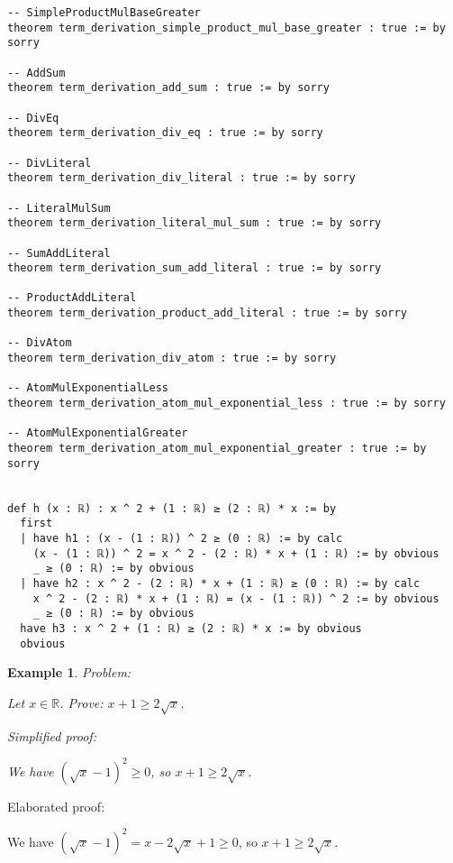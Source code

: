 \documentclass{article}
\newtheorem{example}{Example}
\begin{document}
\begin{tcolorbox}[colback=white!10, width=\linewidth]
\begin{lstlisting}[language=Lean4]
-- SimpleProductMulBaseGreater
theorem term_derivation_simple_product_mul_base_greater : true := by sorry

-- AddSum
theorem term_derivation_add_sum : true := by sorry

-- DivEq
theorem term_derivation_div_eq : true := by sorry

-- DivLiteral
theorem term_derivation_div_literal : true := by sorry

-- LiteralMulSum
theorem term_derivation_literal_mul_sum : true := by sorry

-- SumAddLiteral
theorem term_derivation_sum_add_literal : true := by sorry

-- ProductAddLiteral
theorem term_derivation_product_add_literal : true := by sorry

-- DivAtom
theorem term_derivation_div_atom : true := by sorry

-- AtomMulExponentialLess
theorem term_derivation_atom_mul_exponential_less : true := by sorry

-- AtomMulExponentialGreater
theorem term_derivation_atom_mul_exponential_greater : true := by sorry


def h (x : ℝ) : x ^ 2 + (1 : ℝ) ≥ (2 : ℝ) * x := by
  first
  | have h1 : (x - (1 : ℝ)) ^ 2 ≥ (0 : ℝ) := by calc
    (x - (1 : ℝ)) ^ 2 = x ^ 2 - (2 : ℝ) * x + (1 : ℝ) := by obvious
    _ ≥ (0 : ℝ) := by obvious
  | have h2 : x ^ 2 - (2 : ℝ) * x + (1 : ℝ) ≥ (0 : ℝ) := by calc
    x ^ 2 - (2 : ℝ) * x + (1 : ℝ) = (x - (1 : ℝ)) ^ 2 := by obvious
    _ ≥ (0 : ℝ) := by obvious
  have h3 : x ^ 2 + (1 : ℝ) ≥ (2 : ℝ) * x := by obvious
  obvious

\end{lstlisting}
\end{tcolorbox}


\begin{example}
Problem:
\begin{tcolorbox}[colback=yellow!10, width=\linewidth]
Let $x\in\mathbb{R}$. Prove: $x + 1 \ge 2\sqrt{x}$.
\end{tcolorbox}

Simplified proof:
\begin{tcolorbox}[colback=blue!10, width=\linewidth]
We have $(\sqrt{x}-1)^2 \ge 0$, so $x+1 \ge 2\sqrt{x}$.
\end{tcolorbox}
\end{example}

Elaborated proof:
\begin{tcolorbox}[colback=green!10, width=\linewidth]
We have $(\sqrt{x}-1)^2 = x - 2\sqrt{x} + 1 \ge 0$, so $x+1 \ge 2\sqrt{x}$.
\end{tcolorbox}
\end{document}
